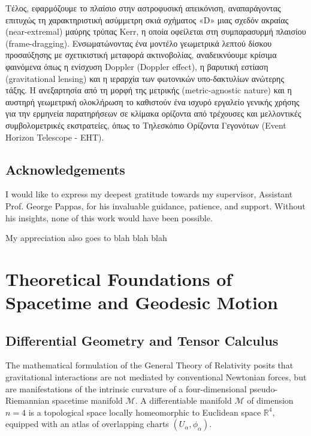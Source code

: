 \documentclass[11pt]{book}
\begin{document}
Τέλος, εφαρμόζουμε το πλαίσιο στην αστροφυσική απεικόνιση, αναπαράγοντας επιτυχώς τη χαρακτηριστική ασύμμετρη σκιά σχήματος «D» μιας σχεδόν ακραίας (near-extremal) μαύρης τρύπας Kerr, η οποία οφείλεται στη συμπαρασυρμή πλαισίου (frame-dragging). Ενσωματώνοντας ένα μοντέλο γεωμετρικά λεπτού δίσκου προσαύξησης με σχετικιστική μεταφορά ακτινοβολίας, αναδεικνύουμε κρίσιμα φαινόμενα όπως η ενίσχυση Doppler (Doppler effect), η βαρυτική εστίαση (gravitational lensing) και η ιεραρχία των φωτονικών υπο-δακτυλίων ανώτερης τάξης. Η ανεξαρτησία από τη μορφή της μετρικής (metric-agnostic nature) και η αυστηρή γεωμετρική ολοκλήρωση το καθιστούν ένα ισχυρό εργαλείο γενικής χρήσης για την ερμηνεία παρατηρήσεων σε κλίμακα ορίζοντα από τρέχουσες και μελλοντικές συμβολομετρικές εκστρατείες, όπως το Τηλεσκόπιο Ορίζοντα Γεγονότων (Event Horizon Telescope - EHT).

\newpage


\section*{Acknowledgements}

I would like to express my deepest gratitude towards my supervisor, Assistant Prof. George Pappas, for his invaluable guidance, patience, and support. Without his insights, none of this work would have been possible. 

My appreciation also goes to blah blah blah

\newpage
\tableofcontents
\newpage

\chapter{Theoretical Foundations of Spacetime and Geodesic Motion}

\section{Differential Geometry and Tensor Calculus}

The mathematical formulation of the General Theory of Relativity posits that gravitational interactions are not mediated by conventional Newtonian forces, but are manifestations of the intrinsic curvature of a four-dimensional pseudo-Riemannian spacetime manifold $\mathcal{M}$. A differentiable manifold $\mathcal{M}$ of dimension $n=4$ is a topological space locally homeomorphic to Euclidean space $\mathbb{R}^4$, equipped with an atlas of overlapping charts $(U_\alpha, \phi_\alpha)$.
\end{document}
